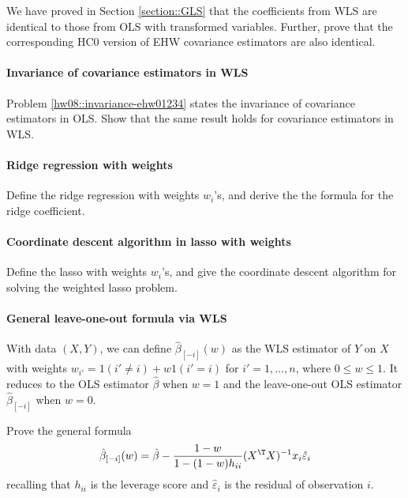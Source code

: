 We have proved in Section \ref{section::GLS} that the coefficients from WLS are identical to those from OLS with transformed variables.
Further, prove that the corresponding HC0 version of EHW covariance estimators are
also identical. 

 
 
 \paragraph{Invariance of covariance estimators in WLS}\label{hw16::invariance-cov-wls}

Problem \ref{hw08::invariance-ehw01234} states the invariance of covariance estimators in OLS. Show that the same result holds for covariance estimators in WLS. 
 
 


\paragraph{Ridge regression with weights}

Define the ridge regression with weights $w_{i}$'s, and derive the
the formula for the ridge coefficient. 

\paragraph{Coordinate descent algorithm in lasso with weights}

Define the lasso with weights $w_{i}$'s, and give the coordinate
descent algorithm for solving the weighted lasso problem. 



\paragraph{General leave-one-out formula via WLS}
\label{hw16::loo-wls}



With data $(X,Y)$, we can define $\hat{\beta}_{[-i]}(w)$ as the WLS estimator of $Y$ on $X$ with weights $w_{i'} = 1(i' \neq i) + w 1(i'=i)$ for $i' = 1,\ldots, n$, where $ 0\leq w \leq 1$.  It reduces to the OLS estimator $\hat\beta$ when $w=1$ and the leave-one-out OLS estimator $\hat{\beta}_{[-i]}$ when $w=0$. 

Prove the general formula 
$$
\hat{\beta}_{[-i]}(w) = \hat{\beta}  - \frac{1-w}{1-(1-w)h_{ii}}  (X^{\T} X)^{-1} x_i \hat{\varepsilon}_i
$$
recalling that $h_{ii}$ is the leverage score and $\hat{\varepsilon}_i$ is the residual of observation $i$. 



